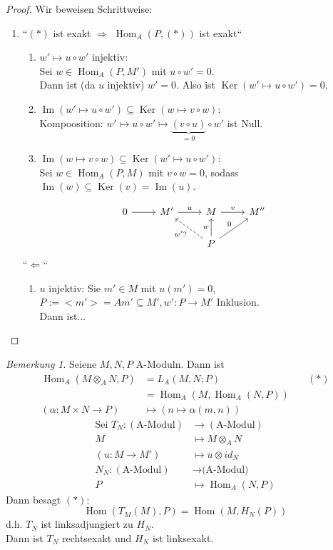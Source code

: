 \documentclass[10pt,a4paper]{article}
\newcommand{\al}{\ensuremath{\alpha}}
\newcommand{\Hom}{\operatorname{Hom}}
\newcommand{\Ker}{\ensuremath{\operatorname{Ker}}}
\newcommand{\Img}{\ensuremath{\operatorname{Im}}}
\newcounter{thm}[section]
\theoremstyle{definition}
\theoremstyle{plain}
\theoremstyle{remark}
\newtheorem{bem}[thm]{Bemerkung}
\begin{document}
\begin{proof}Wir beweisen Schrittweise:
	\begin{enumerate}
		\item ``$(*)$ ist exakt $\Rightarrow$ $\Hom_A(P,(*))$ ist exakt``
		\begin{enumerate}
				\item $w'\mapsto u\circ w'$ injektiv:\\
				Sei $w\in\Hom_A(P,M')$ mit $u\circ w'=0$.\\
				Dann ist (da $u$ injektiv) $w'=0$. Also ist $\Ker(w'\mapsto u\circ w')=0.$
				\item $\Img(w'\mapsto u\circ w')\subseteq\Ker(w\mapsto v\circ w)$:\\
				Kompoosition: $w'\mapsto u\circ w'\mapsto \underbrace{(v\circ u)}_{=0}\circ w'$ ist Null.
				\item $\Img(w\mapsto v\circ w)\subseteq\Ker(w'\mapsto u\circ w')$:\\
				Sei $w\in\Hom_A(P,M)$ mit $v\circ w=0$, sodass $\Img(w)\subseteq\Ker(v)=\Img(u)$.
			\end{enumerate}
			\[\begin{tikzcd}
				0\ar{r} & M'\ar{r}{u} & M\ar{r}{v} & M''\\
				&& P \ar[dashed]{lu}{w'?} \ar{u}{w} \ar{ru}{0}&
			\end{tikzcd}\]
			``$\Leftarrow$``
			\begin{enumerate}
				\item $u$ injektiv: Sie $m'\in M$ mit $u(m')=0$, $P:=<m'>=Am'\subseteq M',w':P\rightarrow M'$ Inklusion.\\
				Dann ist...
			\end{enumerate}
	\end{enumerate}
\end{proof}
\begin{bem}
	\label{bem313}
	Seiene $M,N,P$ A-Moduln. Dann ist
	\begin{align*}
	\Hom_A(M\otimes_A N,P)&=L_A(M,N;P)&\quad (*)\\
	&=\Hom_A(M,\Hom_A(N,P))\\
	(\al:M\times N\rightarrow P)&\mapsto (n\mapsto \al(m,n))
	\end{align*}
	\begin{align*}
	\text{Sei }T_N:(\text{A-Modul})&\rightarrow (\text{A-Modul})\\
	M&\mapsto M\otimes_AN\\
	(u:M\rightarrow M')&\mapsto u\otimes id_N\\
	N_N:(\text{A-Modul})&\rightarrow \text{(A-Modul)}\\
	P&\mapsto \Hom_A(N,P)
	\end{align*}
	Dann besagt $(*)$:
	\[\Hom(T_M(M),P)=\Hom(M,H_N(P))\]
	d.h. $T_N$ ist linksadjungiert zu $H_N$.\\
	Dann ist $T_N$ rechtsexakt und $H_N$ ist linksexakt.
\end{bem}
\end{document}
